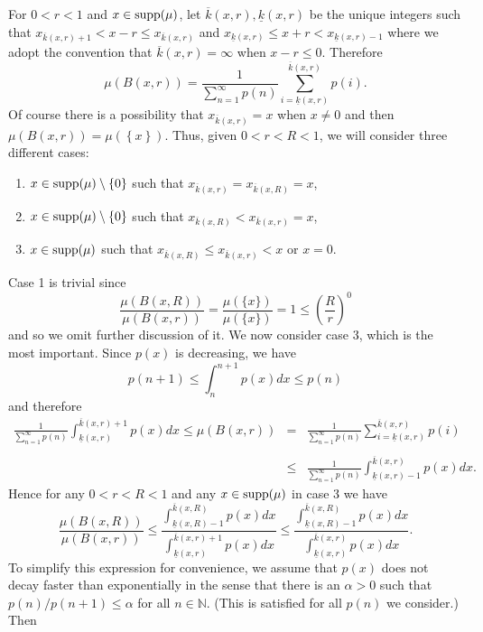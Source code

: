 For  $0<r<1$ and $x\in  \textup{supp}(\mu)$, let $\overline{k}(x,r), \underline{k}(x,r)$   be the unique  integers such that $x_{\overline{k}(x,r)+1}<x-r\le x_{\overline{k}(x,r)}$ and  $x_{\underline{k}(x,r)}\le x+r <x_{\underline{k}(x,r)-1}$ where we adopt the convention that $\overline{k}(x,r) = \infty$ when $x-r \le 0$.    Therefore 
$$
\mu(B(x,r))=\frac{1}{\sum_{n=1}^\infty p(n)} \sum_{i=\underline{k}(x,r)}^{\overline{k}(x,r)} p(i).
$$
Of course there is a possibility that $x_{\overline{k}(x,r)}=x$ when $x\neq 0$ and then $\mu(B(x,r))=\mu(\left\{x\right\})$. Thus, given $0<r<R<1$, we will consider three different cases: 
\begin{enumerate}
	\item $x\in \textup{supp}(\mu) \setminus \left\{ 0\right\}$  such that  $x_{\overline{k}(x,r)}=x_{\overline{k}(x,R)}=x$,
	\item $x\in \textup{supp}(\mu) \setminus \left\{ 0\right\}$ such that  $x_{\overline{k}(x,R)}<x_{\overline{k}(x,r)}=x$,
	\item $x\in \textup{supp}(\mu)$ such that  $x_{\overline{k}(x,R)}\le x_{\overline{k}(x,r)}<x$ or $x=0$.
\end{enumerate}
Case 1 is trivial since
\[
\frac{\mu(B(x,R))}{\mu(B(x,r))}=\frac{\mu(\{x\})}{\mu(\{x\})}=1 \leq \left(\frac{R}{r}\right)^0
\]
and so we omit further discussion of it.   We now consider case 3, which is the most important.  Since $p(x)$ is decreasing, we have
$$p(n+1)\le \int_{n}^{n+1}p(x)dx \le p(n)$$
and therefore
\begin{eqnarray*}
	\frac{1}{\sum_{n=1}^\infty p(n)} \int_{\underline{k}(x,r)}^{\overline{k}(x,r)+1} p(x)dx \le  \mu(B(x,r)) &=& \frac{1}{\sum_{n=1}^\infty p(n)}\sum_{i=\underline{k}(x,r)}^{\overline{k}(x,r)} p(i) \\ \\
	&\le& \frac{1}{\sum_{n=1}^\infty p(n)} \int_{\underline{k}(x,r)-1}^{\overline{k}(x,r)} p(x)dx .
\end{eqnarray*}
Hence for any $0<r<R<1$ and any $x\in  \textup{supp}(\mu)$ in case 3 we have
\[
\frac{\mu(B(x,R))}{\mu(B(x,r))} \le \frac{\int_{\underline{k}(x,R)-1}^{\overline{k}(x,R)} p(x)dx}{\int_{\underline{k}(x,r)}^{\overline{k}(x,r)+1} p(x)dx} \le \frac{\int_{\underline{k}(x,R)-1}^{\overline{k}(x,R)} p(x)dx}{\int_{\underline{k}(x,r)}^{\overline{k}(x,r)} p(x)dx}.
\]
To simplify this expression for convenience, we assume that $p(x)$ does not decay faster than exponentially in the sense that there is an $\alpha>0$ such that $p(n)/p(n+1) \le \alpha$ for all $n\in \mathbb{N}$. (This is satisfied for all $p(n)$ we consider.) Then
